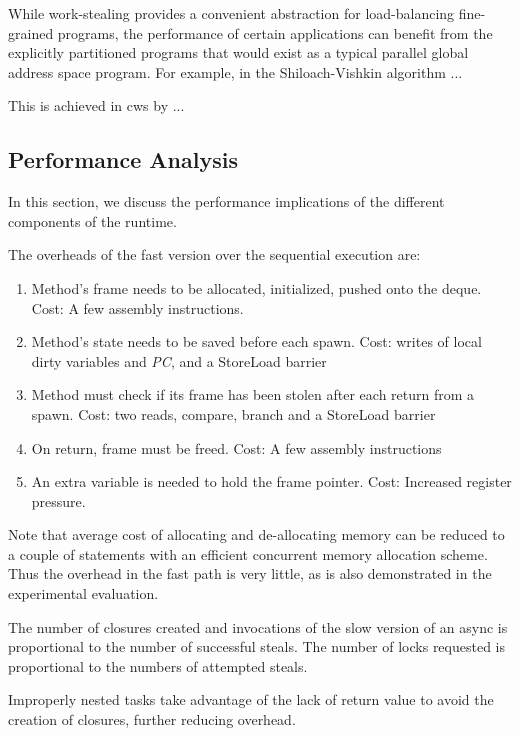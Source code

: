 While work-stealing provides a convenient abstraction for
load-balancing fine-grained programs, the performance of certain
applications can benefit from the explicitly partitioned programs that
would exist as a typical parallel global address space program. For
example, in the Shiloach-Vishkin algorithm ...

This is achieved in cws by ...



\subsection{Performance Analysis}

In this section, we discuss the performance implications of the
different components of the runtime. 

The overheads of the fast version over the sequential execution are:

\begin{enumerate}
\item Method's frame needs to be allocated, initialized, pushed onto
  the deque. Cost: A few assembly instructions.
\item Method's state needs to be saved before each spawn. Cost: writes of
  local dirty variables and {\em PC}, and a StoreLoad barrier
\item Method must check if its frame has been stolen after each
  return from a spawn. Cost: two reads, compare, branch and a 
  StoreLoad barrier 
\item On return, frame must be freed. Cost: A few assembly instructions
\item An extra variable is needed to hold the frame pointer. Cost: Increased
  register pressure.
\end{enumerate}

Note that average cost of allocating and de-allocating memory can be
reduced to a couple of statements with an efficient concurrent memory
allocation scheme. Thus the overhead in the fast path is very
little, as is also demonstrated in the experimental evaluation.

The number of closures created and invocations of the slow version of
an async is proportional to the number of successful steals. The
number of locks requested is proportional to the numbers of attempted
steals. 

Improperly nested tasks take advantage of the lack of return value to
avoid the creation of closures, further reducing overhead. 

